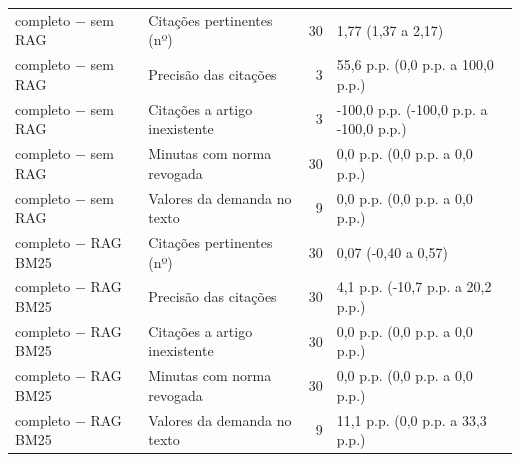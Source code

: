\begin{table}[htbp]
\begin{tabular}{llrl}
\quad completo $-$ sem RAG & Citações pertinentes (nº) & 30 & 1,77 (1,37 a 2,17) \\
\quad completo $-$ sem RAG & Precisão das citações & 3 & 55,6 p.p. (0,0 p.p. a 100,0 p.p.) \\
\quad completo $-$ sem RAG & Citações a artigo inexistente & 3 & -100,0 p.p. (-100,0 p.p. a -100,0 p.p.) \\
\quad completo $-$ sem RAG & Minutas com norma revogada & 30 & 0,0 p.p. (0,0 p.p. a 0,0 p.p.) \\
\quad completo $-$ sem RAG & Valores da demanda no texto & 9 & 0,0 p.p. (0,0 p.p. a 0,0 p.p.) \\
\quad completo $-$ RAG BM25 & Citações pertinentes (nº) & 30 & 0,07 (-0,40 a 0,57) \\
\quad completo $-$ RAG BM25 & Precisão das citações & 30 & 4,1 p.p. (-10,7 p.p. a 20,2 p.p.) \\
\quad completo $-$ RAG BM25 & Citações a artigo inexistente & 30 & 0,0 p.p. (0,0 p.p. a 0,0 p.p.) \\
\quad completo $-$ RAG BM25 & Minutas com norma revogada & 30 & 0,0 p.p. (0,0 p.p. a 0,0 p.p.) \\
\quad completo $-$ RAG BM25 & Valores da demanda no texto & 9 & 11,1 p.p. (0,0 p.p. a 33,3 p.p.) \\
\bottomrule
\end{tabular}
\end{table}
